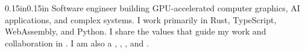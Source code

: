 \vspace{7pt}
\begin{adjustwidth}{0.15in}{0.15in}
\small
Software engineer building GPU-accelerated computer graphics, AI applications, and complex systems.
I work primarily in Rust, TypeScript, WebAssembly, and Python.
I share the values that guide my work and collaboration in
\href{https://spencer.imbleau.com/how-i-work}{}.
I am also a
\mbox{\href{https://rust-lang.org/governance/people/nuzzles/}{}},
\mbox{\href{https://github.com/bevyengine/bevy}{}},
\mbox{\href{https://trunk-rs.github.io/trunk/}{}}, and
\mbox{\href{https://linebender.org/}{}}.
\end{adjustwidth}
\vspace{-5pt}
